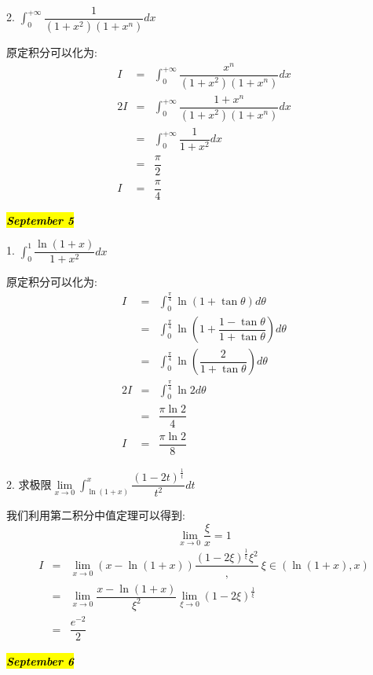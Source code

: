 2. $\int_{0}^{+\infty}\dfrac{1}{(1+x^2)(1+x^n)}dx$
\begin{solution}

	原定积分可以化为:  
	\begin{eqnarray*}
		I&=&\int_{0}^{+\infty}\dfrac{x^n}{(1+x^2)(1+x^n)}dx\\
		2I&=&\int_{0}^{+\infty}\dfrac{1+x^n}{(1+x^2)(1+x^n)}dx\\
		&=&\int_{0}^{+\infty}\dfrac{1}{1+x^2}dx\\
		&=&\dfrac{\pi}{2}\\
		I&=&\dfrac{\pi}{4}
	\end{eqnarray*}
\end{solution}

\hl{\textbf{\textit{September 5}}}

1. $\int_{0}^{1}\dfrac{\ln(1+x)}{1+x^2}dx$
\begin{solution}

	原定积分可以化为:  
	\begin{eqnarray*}
		I&=&\int_{0}^{\frac{\pi}{4}}\ln(1+\tan \theta)d\theta\\
		&=&\int_{0}^{\frac{\pi}{4}}\ln(1+\dfrac{1-\tan\theta}{1+\tan\theta})d\theta\\
		&=&\int_{0}^{\frac{\pi}{4}}\ln(\dfrac{2}{1+\tan\theta})d\theta\\
		2I&=&\int_{0}^{\frac{\pi}{4}}\ln2d\theta\\
		&=&\dfrac{\pi \ln 2}{4}\\
		I&=&\dfrac{\pi \ln 2}{8}
	\end{eqnarray*}
\end{solution}

2. 求极限$\lim\limits_{x\rightarrow 0}\int_{\ln(1+x)}^{x}\dfrac{(1-2t)^{\frac{1}{t}}}{t^2}dt$
\begin{solution}

	我们利用第二积分中值定理可以得到:  
	$$\lim\limits_{x\rightarrow 0}\dfrac{\xi}{x}=1$$
	\begin{eqnarray*}
		I&=&\lim\limits_{x\rightarrow 0}(x-\ln(1+x))\dfrac{(1-2\xi)^{\frac{1}{\xi}}{\xi^2}},\ \xi\in(\ln(1+x),x)\\
		 &=&\lim\limits_{x\rightarrow 0}\dfrac{x-\ln(1+x)}{\xi^2}\lim\limits_{\xi\rightarrow 0}(1-2\xi)^{\frac{1}{\xi}}\\
		 &=&\dfrac{e^{-2}}{2}
	\end{eqnarray*}
\end{solution}

\hl{\textbf{\textit{September 6}}}

